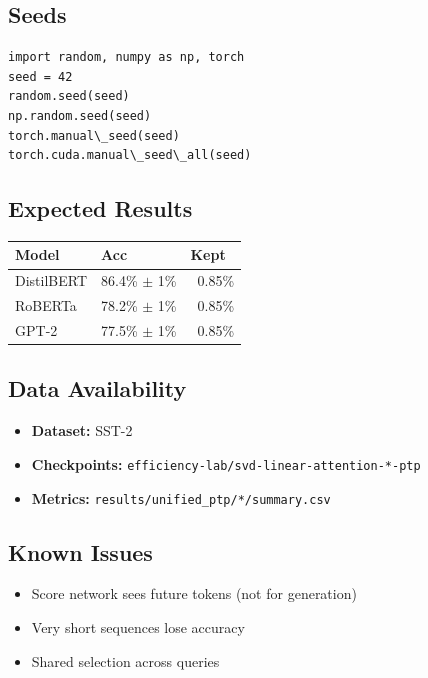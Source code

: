 \subsection{Seeds}

\begin{lstlisting}
import random, numpy as np, torch
seed = 42
random.seed(seed)
np.random.seed(seed)
torch.manual\_seed(seed)
torch.cuda.manual\_seed\_all(seed)
\end{lstlisting}

\subsection{Expected Results}

\begin{table}[H]
\centering
\small
\begin{tabular}{lll}
\toprule
\textbf{Model} & \textbf{Acc} & \textbf{Kept} \\
\midrule
DistilBERT & 86.4\% $\pm$ 1\% & ~0.85\% \\
RoBERTa & 78.2\% $\pm$ 1\% & ~0.85\% \\
GPT-2 & 77.5\% $\pm$ 1\% & ~0.85\% \\
\bottomrule
\end{tabular}
\end{table}

\subsection{Data Availability}

\begin{itemize}
\item \textbf{Dataset:} SST-2
\item \textbf{Checkpoints:} \texttt{efficiency-lab/svd-linear-attention-*-ptp}
\item \textbf{Metrics:} \texttt{results/unified\_ptp/*/summary.csv}

\end{itemize}
\subsection{Known Issues}

\begin{itemize}
\item Score network sees future tokens (not for generation)
\item Very short sequences lose accuracy
\item Shared selection across queries

\end{itemize}
